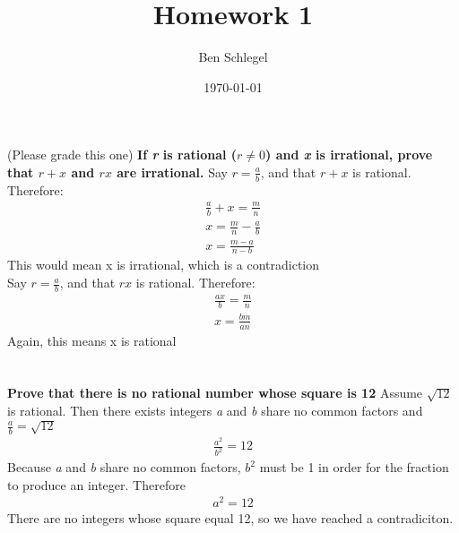 \documentclass{article}
\author{Ben Schlegel
}
\title{Homework 1}
\date{\today}
\begin{document}
\maketitle
\section{} (Please grade this one)
\noindent \textbf{If \emph{r} is rational ($r \neq 0$) and \emph{x} is irrational, prove that $r + x$ and $rx$ are irrational.}\newline
Say $r = \frac{a}{b}$, and that $r + x$ is rational. Therefore:
\begin{align*}
\frac{a}{b} + x = \frac{m}{n}\\
x = \frac{m}{n} - \frac{a}{b}\\
x = \frac{m - a }{n - b}
\end{align*}
This would mean x is irrational, which is a contradiction\\
Say $r = \frac{a}{b}$, and that $rx$ is rational. Therefore:
\begin{align*}
\frac{ax}{b} = \frac{m}{n}\\
x = \frac{bm}{an} 
\end{align*}
Again, this means x is rational

\section{}
\noindent \textbf{Prove that there is no rational number whose square is 12}\newline 
Assume $\sqrt{12}$ is rational. Then there exists integers \emph{a} and \emph{b} share no common factors and $\frac{a}{b} = \sqrt{12}$
\begin{align*}
\frac{a^2}{b^2} = 12
\end{align*}
Because \emph{a} and \emph{b} share no common factors, $b^2$ must be 1 in order for the fraction to produce an integer. Therefore
\begin{align*}
a^2 = 12
\end{align*}
There are no integers whose square equal 12, so we have reached a contradiciton.
\end{document}
